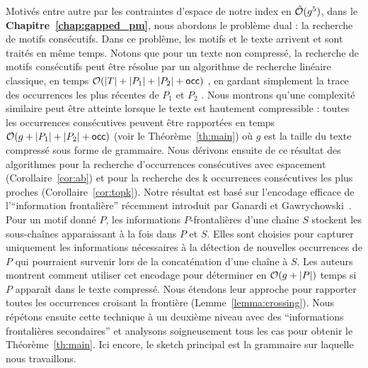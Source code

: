 Motivés entre autre par les contraintes d'espace de notre index en $\tilde {\mathcal{O}}(g^5)$, dans le \textbf{Chapitre~\ref{chap:gapped_pm}}, nous abordons le problème dual : la recherche de motifs consécutifs. Dans ce problème, les motifs et le texte arrivent et sont traités en même temps. Notons que pour un texte non compressé, la recherche de motifs consécutifs peut être résolue par un algorithme de recherche linéaire classique, en temps $\mathcal{O}(|T|+|P_1|+|P_2|+\mathsf{occ})$ , en gardant simplement la trace des occurrences les plus récentes de $P_1$ et $P_2$ .
Nous montrons qu'une complexité similaire peut être atteinte lorsque le texte est hautement compressible : toutes les occurrences consécutives peuvent être rapportées en temps $\mathcal{O}(g+|P_1|+|P_2|+\mathsf{occ})$ (voir le Théorème~\ref{th:main}) où $g$ est la taille du texte compressé sous forme de grammaire. Nous dérivons ensuite de ce résultat des algorithmes pour la recherche d'occurrences consécutives avec espacement (Corollaire~\ref{cor:ab}) et pour la recherche des k occurrences consécutives les plus proches (Corollaire~\ref{cor:topk}).
%
Notre résultat est basé sur l'encodage efficace de l'``information frontalière'' récemment introduit par Ganardi et Gawrychowski~\cite{DBLP:conf/soda/GanardiG22}. Pour un motif donné $P$, les informations $P$-frontalières d'une chaîne $S$ stockent les sous-chaînes apparaissant à la fois dans $P$ et $S$. Elles sont choisies pour capturer uniquement les informations nécessaires à la détection de nouvelles occurrences de $P$ qui pourraient survenir lors de la concaténation d'une chaîne à $S$. 
%
Les auteurs montrent comment utiliser cet encodage pour déterminer en $\mathcal{O}(g+|P|)$ temps si $P$ apparaît dans le texte compressé. Nous étendons leur approche pour rapporter toutes les occurrences croisant la frontière (Lemme~\ref{lemma:crossing}). Nous répétons ensuite cette technique à un deuxième niveau avec des ``informations frontalières secondaires'' et analysons soigneusement tous les cas pour obtenir le Théorème~\ref{th:main}. Ici encore, le sketch principal est la grammaire sur laquelle nous travaillons.\\


